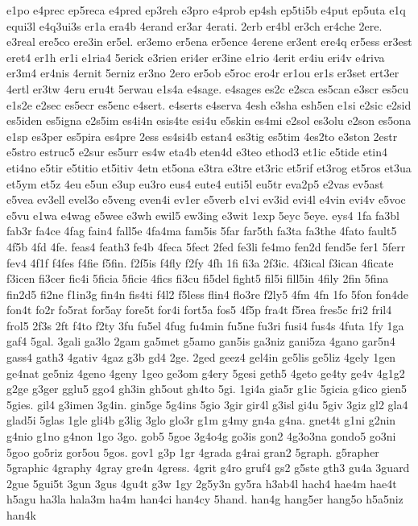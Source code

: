 {e1po
e4prec
ep5reca
e4pred
ep3reh
e3pro
e4prob
ep4sh
ep5ti5b
e4put
ep5uta
e1q
equi3l
e4q3ui3s
er1a
era4b
4erand
er3ar
4erati.
2erb
er4bl
er3ch
er4che
2ere.
e3real
ere5co
ere3in
er5el.
er3emo
er5ena
er5ence
4erene
er3ent
ere4q
er5ess
er3est
eret4
er1h
er1i
e1ria4
5erick
e3rien
eri4er
er3ine
e1rio
4erit
er4iu
eri4v
e4riva
er3m4
er4nis
4ernit
5erniz
er3no
2ero
er5ob
e5roc
ero4r
er1ou
er1s
er3set
ert3er
4ertl
er3tw
4eru
eru4t
5erwau
e1s4a
e4sage.
e4sages
es2c
e2sca
es5can
e3scr
es5cu
e1s2e
e2sec
es5ecr
es5enc
e4sert.
e4serts
e4serva
4esh
e3sha
esh5en
e1si
e2sic
e2sid
es5iden
es5igna
e2s5im
es4i4n
esis4te
esi4u
e5skin
es4mi
e2sol
es3olu
e2son
es5ona
e1sp
es3per
es5pira
es4pre
2ess
es4si4b
estan4
es3tig
es5tim
4es2to
e3ston
2estr
e5stro
estruc5
e2sur
es5urr
es4w
eta4b
eten4d
e3teo
ethod3
et1ic
e5tide
etin4
eti4no
e5tir
e5titio
et5itiv
4etn
et5ona
e3tra
e3tre
et3ric
et5rif
et3rog
et5ros
et3ua
et5ym
et5z
4eu
e5un
e3up
eu3ro
eus4
eute4
euti5l
eu5tr
eva2p5
e2vas
ev5ast
e5vea
ev3ell
evel3o
e5veng
even4i
ev1er
e5verb
e1vi
ev3id
evi4l
e4vin
evi4v
e5voc
e5vu
e1wa
e4wag
e5wee
e3wh
ewil5
ew3ing
e3wit
1exp
5eyc
5eye.
eys4
1fa
fa3bl
fab3r
fa4ce
4fag
fain4
fall5e
4fa4ma
fam5is
5far
far5th
fa3ta
fa3the
4fato
fault5
4f5b
4fd
4fe.
feas4
feath3
fe4b
4feca
5fect
2fed
fe3li
fe4mo
fen2d
fend5e
fer1
5ferr
fev4
4f1f
f4fes
f4fie
f5fin.
f2f5is
f4fly
f2fy
4fh
1fi
fi3a
2f3ic.
4f3ical
f3ican
4ficate
f3icen
fi3cer
fic4i
5ficia
5ficie
4fics
fi3cu
fi5del
fight5
fil5i
fill5in
4fily
2fin
5fina
fin2d5
fi2ne
f1in3g
fin4n
fis4ti
f4l2
f5less
flin4
flo3re
f2ly5
4fm
4fn
1fo
5fon
fon4de
fon4t
fo2r
fo5rat
for5ay
fore5t
for4i
fort5a
fos5
4f5p
fra4t
f5rea
fres5c
fri2
fril4
frol5
2f3s
2ft
f4to
f2ty
3fu
fu5el
4fug
fu4min
fu5ne
fu3ri
fusi4
fus4s
4futa
1fy
1ga
gaf4
5gal.
3gali
ga3lo
2gam
ga5met
g5amo
gan5is
ga3niz
gani5za
4gano
gar5n4
gass4
gath3
4gativ
4gaz
g3b
gd4
2ge.
2ged
geez4
gel4in
ge5lis
ge5liz
4gely
1gen
ge4nat
ge5niz
4geno
4geny
1geo
ge3om
g4ery
5gesi
geth5
4geto
ge4ty
ge4v
4g1g2
g2ge
g3ger
gglu5
ggo4
gh3in
gh5out
gh4to
5gi.
1gi4a
gia5r
g1ic
5gicia
g4ico
gien5
5gies.
gil4
g3imen
3g4in.
gin5ge
5g4ins
5gio
3gir
gir4l
g3isl
gi4u
5giv
3giz
gl2
gla4
glad5i
5glas
1gle
gli4b
g3lig
3glo
glo3r
g1m
g4my
gn4a
g4na.
gnet4t
g1ni
g2nin
g4nio
g1no
g4non
1go
3go.
gob5
5goe
3g4o4g
go3is
gon2
4g3o3na
gondo5
go3ni
5goo
go5riz
gor5ou
5gos.
gov1
g3p
1gr
4grada
g4rai
gran2
5graph.
g5rapher
5graphic
4graphy
4gray
gre4n
4gress.
4grit
g4ro
gruf4
gs2
g5ste
gth3
gu4a
3guard
2gue
5gui5t
3gun
3gus
4gu4t
g3w
1gy
2g5y3n
gy5ra
h3ab4l
hach4
hae4m
hae4t
h5agu
ha3la
hala3m
ha4m
han4ci
han4cy
5hand.
han4g
hang5er
hang5o
h5a5niz
han4k
}
